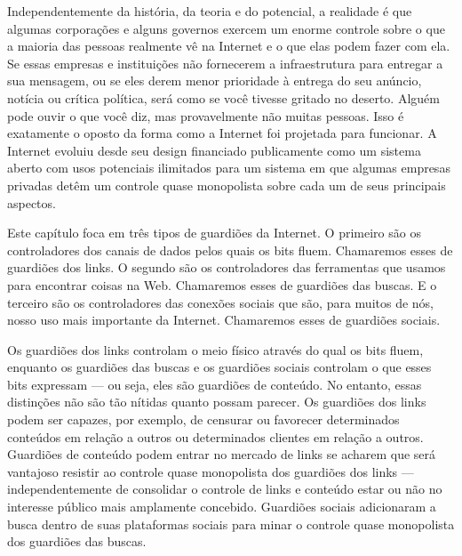 Independentemente da história, da teoria e do potencial, a realidade é que algumas
corporações e alguns governos exercem um enorme controle sobre o que a maioria das
pessoas realmente vê na Internet e o que elas podem fazer com ela. Se essas empresas e
instituições não fornecerem a infraestrutura para entregar a sua mensagem, ou se eles
derem menor prioridade à entrega do seu anúncio, notícia ou crítica política, será como
se você tivesse gritado no deserto. Alguém pode ouvir o que você diz, mas provavelmente
não muitas pessoas. Isso é exatamente o oposto da forma como a Internet foi projetada
para funcionar. A Internet evoluiu desde seu design financiado publicamente como um
sistema aberto com usos potenciais ilimitados para um sistema em que algumas empresas
privadas detêm um controle quase monopolista sobre cada um de seus principais aspectos.

Este capítulo foca em três tipos de guardiões da Internet. O primeiro são os controladores
dos canais de dados pelos quais os bits fluem. Chamaremos esses de guardiões dos links.
O segundo são os controladores das ferramentas que usamos para encontrar coisas na Web.
Chamaremos esses de guardiões das buscas. E o terceiro são os controladores das conexões
sociais que são, para muitos de nós, nosso uso mais importante da Internet. Chamaremos
esses de guardiões sociais.

Os guardiões dos links controlam o meio físico através do qual os bits fluem, enquanto
os guardiões das buscas e os guardiões sociais controlam o que esses bits expressam
--- ou seja, eles são guardiões de conteúdo. No entanto, essas distinções não são tão
nítidas quanto possam parecer. Os guardiões dos links podem ser capazes, por exemplo,
de censurar ou favorecer determinados conteúdos em relação a outros ou determinados
clientes em relação a outros. Guardiões de conteúdo podem entrar no mercado de links se
acharem que será vantajoso resistir ao controle quase monopolista dos guardiões dos links
--- independentemente de consolidar o controle de links e conteúdo estar ou não no
interesse público mais amplamente concebido. Guardiões sociais adicionaram a busca dentro
de suas plataformas sociais para minar o controle quase monopolista dos guardiões das
buscas.

